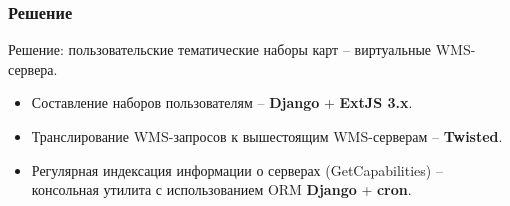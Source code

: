 \begin{frame}
  \frametitle{Решение}
  
  Решение: пользовательские тематические наборы карт -- виртуальные
  WMS-сервера.

  \begin{itemize}
  \item Составление наборов пользователям -- \textbf{Django} +
    \textbf{ExtJS 3.x}.
  \item Транслирование WMS-запросов к вышестоящим WMS-серверам -- \textbf{Twisted}.
  \item Регулярная индексация информации о серверах (GetCapabilities)
    -- консольная утилита с использованием ORM \textbf{Django} + \textbf{cron}.
  \end{itemize}
\end{frame}

